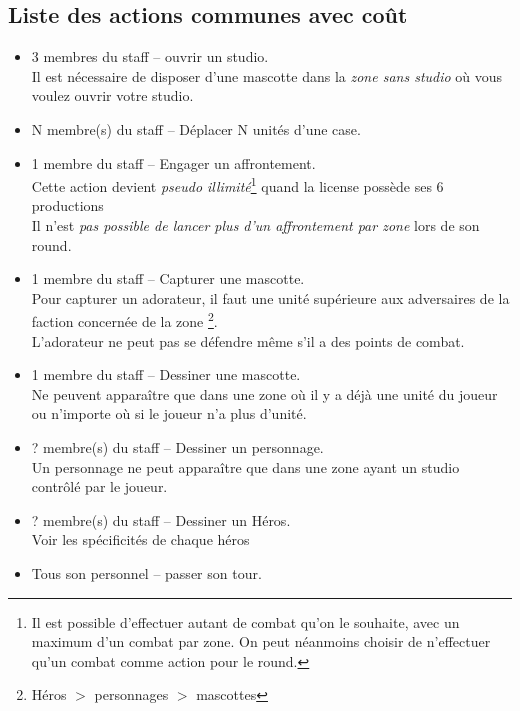             \subsection{Liste des actions communes avec coût}

                \begin{itemize}
                    \item 3 membres du staff – ouvrir un studio. \\
                        Il est nécessaire de disposer d'une mascotte dans la \emph{zone sans studio} où vous voulez ouvrir votre studio.
                    \item N membre(s) du staff – Déplacer N unités d'une case.
                    \item 1 membre du staff – Engager un affrontement. \\
                        Cette action devient \textit{pseudo illimité}\footnote{Il est possible d'effectuer autant de combat qu'on le souhaite,
                        avec un maximum d'un combat par zone. On peut néanmoins choisir de n'effectuer qu'un combat comme action pour le round.}
                        quand la license possède ses 6 productions \\
                        Il n'est \emph{pas possible de lancer plus d'un affrontement par zone} lors de son round.
                    \item 1 membre du staff – Capturer une mascotte. \\
                        Pour capturer un adorateur, il faut une unité supérieure aux adversaires de la faction concernée de la zone
                        \footnote{Héros \(>\) personnages \(>\) mascottes}. \\
                        L'adorateur ne peut pas se défendre même s'il a des points de combat.
                    \item 1 membre du staff – Dessiner une mascotte. \\
                        Ne peuvent apparaître que dans une zone où il y a déjà une unité du joueur ou
                        n'importe où si le joueur n'a plus d'unité.
                    \item ? membre(s) du staff – Dessiner un personnage. \\
                        Un personnage ne peut apparaître que dans une zone ayant un studio contrôlé par le joueur.
                    \item ? membre(s) du staff – Dessiner un Héros. \\
                        Voir les spécificités de chaque héros
                    \item Tous son personnel – passer son tour.
                \end{itemize}


